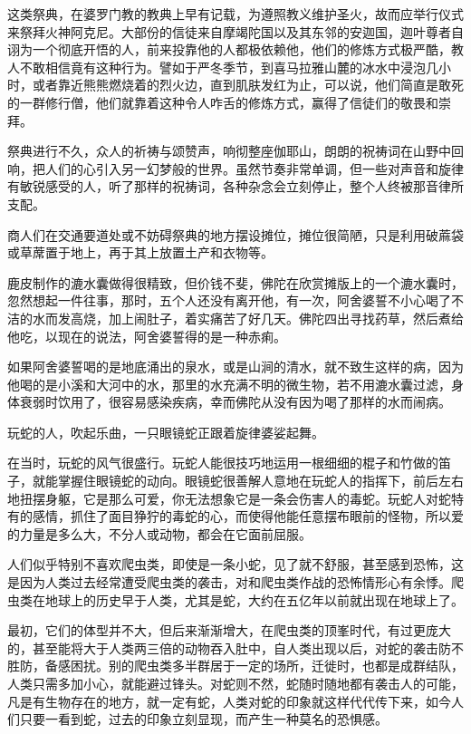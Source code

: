 \documentclass[12pt,twoside,openany]{book}
\begin{document}
这类祭典，在婆罗门教的教典上早有记载，为遵照教义维护圣火，故而应举行仪式来祭拜火神阿克尼。大部份的信徒来自摩竭陀国以及其东邻的安迦国，迦叶尊者自诩为一个彻底开悟的人，前来投靠他的人都极依赖他，他们的修炼方式极严酷，教人不敢相信竟有这种行为。譬如于严冬季节，到喜马拉雅山麓的冰水中浸泡几小时，或者靠近熊熊燃烧着的烈火边，直到肌肤发红为止，可以说，他们简直是敢死的一群修行僧，他们就靠着这种令人咋舌的修炼方式，赢得了信徒们的敬畏和崇拜。

祭典进行不久，众人的祈祷与颂赞声，响彻整座伽耶山，朗朗的祝祷词在山野中回响，把人们的心引入另一幻梦般的世界。虽然节奏非常单调，但一些对声音和旋律有敏锐感受的人，听了那样的祝祷词，各种杂念会立刻停止，整个人终被那音律所支配。

商人们在交通要道处或不妨碍祭典的地方摆设摊位，摊位很简陋，只是利用破蔴袋或草蓆置于地上，再于其上放置土产和衣物等。

鹿皮制作的漉水囊做得很精致，但价钱不斐，佛陀在欣赏摊版上的一个漉水囊时，忽然想起一件往事，那时，五个人还没有离开他，有一次，阿舍婆誓不小心喝了不洁的水而发高烧，加上闹肚子，着实痛苦了好几天。佛陀四出寻找药草，然后煮给他吃，以现在的说法，阿舍婆誓得的是一种赤痢。

如果阿舍婆誓喝的是地底涌出的泉水，或是山涧的清水，就不致生这样的病，因为他喝的是小溪和大河中的水，那里的水充满不明的微生物，若不用漉水囊过滤，身体衰弱时饮用了，很容易感染疾病，幸而佛陀从没有因为喝了那样的水而闹病。

玩蛇的人，吹起乐曲，一只眼镜蛇正跟着旋律婆娑起舞。

在当时，玩蛇的风气很盛行。玩蛇人能很技巧地运用一根细细的棍子和竹做的笛子，就能掌握住眼镜蛇的动向。眼镜蛇很善解人意地在玩蛇人的指挥下，前后左右地扭摆身躯，它是那么可爱，你无法想象它是一条会伤害人的毒蛇。玩蛇人对蛇特有的感情，抓住了面目狰狞的毒蛇的心，而使得他能任意摆布眼前的怪物，所以爱的力量是多么大，不分人或动物，都会在它面前屈服。

人们似乎特别不喜欢爬虫类，即使是一条小蛇，见了就不舒服，甚至感到恐怖，这是因为人类过去经常遭受爬虫类的袭击，对和爬虫类作战的恐怖情形心有余悸。爬虫类在地球上的历史早于人类，尤其是蛇，大约在五亿年以前就出现在地球上了。

最初，它们的体型并不大，但后来渐渐增大，在爬虫类的顶峯时代，有过更庞大的，甚至能将大于人类两三倍的动物吞入肚中，自人类出现以后，对蛇的袭击防不胜防，备感困扰。别的爬虫类多半群居于一定的场所，迁徙时，也都是成群结队，人类只需多加小心，就能避过锋头。对蛇则不然，蛇随时随地都有袭击人的可能，凡是有生物存在的地方，就一定有蛇，人类对蛇的印象就这样代代传下来，如今人们只要一看到蛇，过去的印象立刻显现，而产生一种莫名的恐惧感。
\end{document}
